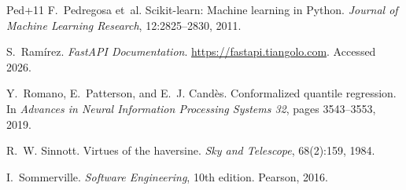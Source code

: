 \documentclass[12pt,letterpaper,twoside,openany]{report}
\begin{document}
\begin{thebibliography}{Ped+11}
 F.~Pedregosa et~al. Scikit-learn: Machine learning in Python. \emph{Journal of
  Machine Learning Research}, 12:2825--2830, 2011.

 S.~Ram\'irez. \emph{FastAPI Documentation}. \url{https://fastapi.tiangolo.com}.
  Accessed 2026.

 Y.~Romano, E.~Patterson, and E.~J. Cand\`es. Conformalized quantile regression. In
  \emph{Advances in Neural Information Processing Systems 32}, pages 3543--3553, 2019.

 R.~W. Sinnott. Virtues of the haversine. \emph{Sky and Telescope}, 68(2):159, 1984.

 I.~Sommerville. \emph{Software Engineering}, 10th edition. Pearson, 2016.

\end{thebibliography}
\end{document}
